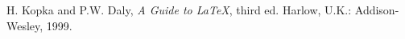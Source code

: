 \documentclass[10pt,journal,cspaper,compsoc]{IEEEtran}
\begin{document}
%
%
%
\begin{thebibliography}{1}

H. Kopka and P.W. Daly, \emph{A Guide to {\LaTeX}}, third ed. Harlow, U.K.: Addison-Wesley, 1999.





\end{thebibliography}

%
\end{document}
